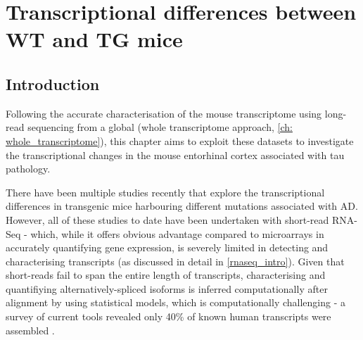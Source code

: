 \chapter{Transcriptional differences between WT and TG mice}\label{ch: transcriptional_global_differences}

\section{Introduction}

Following the accurate characterisation of the mouse transcriptome using long-read sequencing from a global (whole transcriptome approach, \cref{ch: whole_transcriptome}), this chapter aims to exploit these datasets to investigate the transcriptional changes in the mouse entorhinal cortex associated with tau pathology. 

There have been multiple studies recently that explore the transcriptional differences in transgenic mice harbouring different mutations associated with AD. However, all of these studies to date have been undertaken with short-read RNA-Seq - which, while it offers obvious advantage compared to microarrays in accurately quantifying gene expression, is severely limited in detecting and characterising transcripts (as discussed in detail in \cref{rnaseq_intro}). Given that short-reads fail to span the entire length of transcripts, characterising and quantifiying alternatively-spliced isoforms is inferred computationally after alignment by using statistical models, which is computationally challenging - a survey of current tools revealed only 40\% of known human transcripts were assembled \cite{Steijger2013}.  

